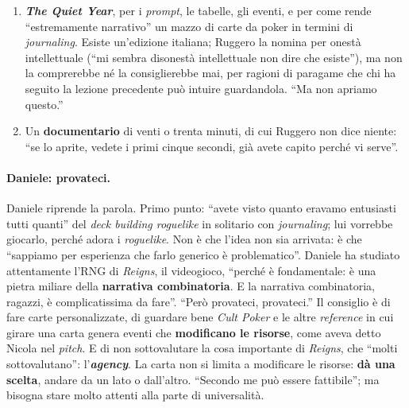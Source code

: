 \begin{enumerate}
        interessanti. Ma è ``al confine'' di ciò che serve al gruppo: ``guardatelo solo
        se avete la disperazione più totale nel cuore''. A Ruggero è piaciuto moltissimo,
        ma potrebbe far deragliare il progetto.
  \item \textbf{\emph{The Quiet Year}}, per i \emph{prompt}, le tabelle, gli eventi, e
        per come rende ``estremamente narrativo'' un mazzo di carte da poker in termini
        di \emph{journaling}. Esiste un'edizione italiana; Ruggero la nomina per onestà
        intellettuale (``mi sembra disonestà intellettuale non dire che esiste''), ma
        non la comprerebbe né la consiglierebbe mai, per ragioni di paragame che chi ha
        seguito la lezione precedente può intuire guardandola. ``Ma non apriamo questo.''
  \item Un \textbf{documentario} di venti o trenta minuti, di cui Ruggero non dice
        niente: ``se lo aprite, vedete i primi cinque secondi, già avete capito perché vi
        serve''.
\end{enumerate}

\paragraph{Daniele: provateci.} Daniele riprende la parola. Primo punto: ``avete visto
quanto eravamo entusiasti tutti quanti'' del \emph{deck building roguelike} in
solitario con \emph{journaling}; lui vorrebbe giocarlo, perché adora i \emph{roguelike}. Non è che l'idea non
sia arrivata: è che ``sappiamo per esperienza che farlo generico è problematico''. Daniele
ha studiato attentamente l'RNG di \emph{Reigns}, il videogioco, ``perché è fondamentale:
è una pietra miliare della \textbf{narrativa combinatoria}. E la narrativa combinatoria,
ragazzi, è complicatissima da fare''. ``Però provateci, provateci.'' Il consiglio è di
fare carte personalizzate, di guardare bene \emph{Cult Poker} e le altre \emph{reference}
in cui girare una carta genera eventi che \textbf{modificano le risorse}, come aveva
detto Nicola nel \emph{pitch}. E di non sottovalutare la cosa importante di
\emph{Reigns}, che ``molti sottovalutano'': l'\textbf{\emph{agency}}. La carta non si
limita a modificare le risorse: \textbf{dà una scelta}, andare da un lato o dall'altro.
``Secondo me può essere fattibile''; ma bisogna stare molto attenti alla parte di
universalità.

